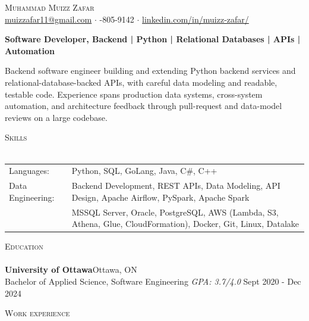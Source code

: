 \documentclass[a4paper]{article}
\newcommand{\lineunder} {
    \vspace*{-8pt} \\
    \hspace*{-18pt} \hrulefill \\
}
\newcommand{\header} [1] {
    {\hspace*{-18pt}\vspace*{6pt} \textsc{#1}}
    \vspace*{-6pt} \lineunder
}
\begin{document}
\vspace*{-40pt}

\vspace*{-10pt}
\begin{center}
	{\Huge \scshape {Muhammad Muizz Zafar}}\\
	\faSend \space \href{mailto:muizzafar11@gmail.com}{muizzafar11@gmail.com} $\cdot$ \faPhoneSquare {}-805-9142 $\cdot$ \faLinkedinSquare \space \href{https://www.linkedin.com/in/muizz-zafar/}{linkedin.com/in/muizz-zafar/}
	\\
\end{center}

\vspace{-5pt}
\begin{center}
\textbf{Software Developer, Backend | Python | Relational Databases | APIs | Automation}
\end{center}
\begin{center}
Backend software engineer building and extending Python backend services and relational-database-backed APIs, with careful data modeling and readable, testable code. Experience spans production data systems, cross-system automation, and architecture feedback through pull-request and data-model reviews on a large codebase.
\end{center}

\header{Skills}
\begin{tabular}{ l l }
	Languages: 
& Python, SQL, GoLang, Java, C\#, C++ \\

Data Engineering: 
& Backend Development, REST APIs, Data Modeling, API Design, Apache Airflow, PySpark, Apache Spark\\
& MSSQL Server, Oracle, PostgreSQL, AWS (Lambda, S3, Athena, Glue, CloudFormation), Docker, Git, Linux, Datalake

\end{tabular}

\header{Education}
\textbf{University of Ottawa}\hfill Ottawa, ON\\
Bachelor of Applied Science, Software Engineering \textit{GPA: 3.7/4.0} \hfill Sept 2020 - Dec 2024\\
\vspace{2mm}

\header{Work experience}
\vspace{1.5mm}
\end{document}
